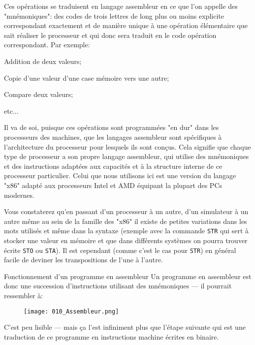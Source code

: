 \documentclass[12pt]{article}
\begin{document}
	 Ces opérations se traduisent en langage assembleur en ce que l'on appelle des "mnémoniques": des codes de trois lettres de long plus ou moins explicite correspondant exactement et de manière unique à une opération élémentaire que sait réaliser le processeur et qui donc sera traduit en le code opération correspondant. Par exemple:
	 \begin{description}
	 	\item[ADD] Addition de deux valeurs;
	 	\item[MOV] Copie d'une valeur d'une case mémoire vers une autre;
	 	\item[CMP] Compare deux valeurs;
	 	\item etc...
	 \end{description}
	 
	 Il va de soi, puisque ces opérations sont programmées "en dur" dans les processeurs des machines, que les langages assembleur sont spécifiques à l'architecture du processeur pour lesquels ils sont conçus. Cela signifie que chaque type de processeur a son propre langage assembleur, qui utilise des mnémoniques et des instructions adaptées aux capacités et à la structure interne de ce processeur particulier. Celui que nous utilisons ici est une version du langage "x86" adapté aux processeurs Intel et AMD équipant la plupart des PCs modernes.
	 
	 Vous constaterez qu'en passant d'un processeur à un autre, d'un simulateur à un autre même au sein de la famille des "x86" il existe de petites variations dans les mots utilisés et même dans la syntaxe (exemple avec la commande \texttt{STR} qui sert à stocker une valeur en mémoire et que dans différents systèmes on pourra trouver écrite \texttt{STO} ou \texttt{STA}). Il est cependant (comme c'est le cas pour \texttt{STR}) en général facile de deviner les transpositions de l'une à l'autre.
	 
	 \begin{MonAmp}{Fonctionnement d'un programme en assembleur}
	 	Un programme en assembleur est donc une succession d'instructions utilisant des mnémoniques --- il pourrait ressembler à:
	 	
	 	\begin{figure}[H]
	 		\centering
	 		\texttt{[image: 010\_Assembleur.png]}
	 	\end{figure}
	 	
	 	C'est peu lisible --- mais ça l'est infiniment plus que l'étape suivante qui est une traduction de ce programme en instructions machine écrites en binaire.
	 \end{MonAmp}
	 
\end{document}
